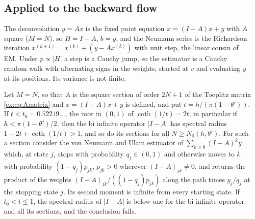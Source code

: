 \subsection{Applied to the backward flow}

The deconvolution $y=Ax$ is the fixed point equation $x=(I-A)x+y$ with $A$ square ($M=N$), so $H=I-A$, $b=y$, and the Neumann series is the Richardson iteration $x^{(k+1)}=x^{(k)}+(y-Ax^{(k)})$ with unit step, the linear cousin of EM. Under $p\propto|H|$ a step is a Cauchy jump, so the estimator is a Cauchy random walk with alternating signs in the weights, started at $v$ and evaluating $y$ at its positions. Its variance is not finite.

\begin{proposition}\label{cx:prop:vnvar}
Let $M=N$, so that $A$ is the square section of order $2N+1$ of the Toeplitz matrix \eqref{cx:eq:Amatrix} and $x=(I-A)x+y$ is defined, and put $t=h/(\pi(1-\theta'))$. If $t<t_0=0.52219\ldots$, the root in $(0,1)$ of $\coth(1/t)=2t$, in particular if $h<\pi(1-\theta')/2$, then the bi infinite operator $|I-A|$ has spectral radius $1-2t+\coth(1/t)>1$, and so do its sections for all $N\ge N_0(h,\theta')$. For such a section consider the von Neumann and Ulam estimator of $\sum_{k\ge0}(I-A)^ky$ which, at state $j$, stops with probability $q_j\in(0,1)$ and otherwise moves to $k$ with probability $(1-q_j)p_{jk}$, $p_{jk}>0$ wherever $(I-A)_{jk}\ne0$, and returns the product of the weights $(I-A)_{jk}/((1-q_j)p_{jk})$ along the path times $y_j/q_j$ at the stopping state $j$. Its second moment is infinite from every starting state. If $t_0<t\le1$, the spectral radius of $|I-A|$ is below one for the bi infinite operator and all its sections, and the conclusion fails.
\end{proposition}

